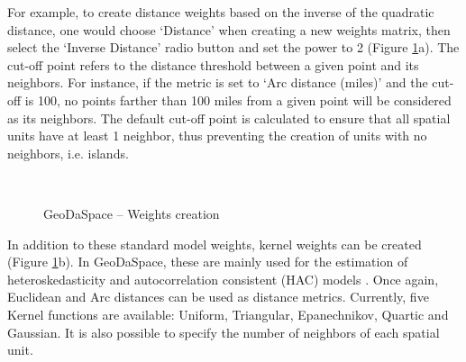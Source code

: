 \documentclass{article}
\begin{document}
For example, to create distance weights based on the inverse of the quadratic distance, one would choose `Distance' when creating a new weights matrix, then select the `Inverse Distance' radio button and set the power to 2 (Figure \ref{f:weights}a). The cut-off point refers to the distance threshold between a given point and its neighbors.  For instance, if the metric is set to `Arc distance (miles)' and the cut-off is 100, no points farther than 100 miles from a given point will be considered as its neighbors. The default cut-off point is calculated to ensure that all spatial units have at least 1 neighbor, thus preventing the creation of units with no neighbors, i.e. islands.

\begin{figure}[htb]
\centering
{} 
 \\
\caption{GeoDaSpace -- Weights creation}
\label{f:weights}
\end{figure}

In addition to these standard model weights, kernel weights can be created (Figure \ref{f:weights}b). In GeoDaSpace, these are mainly used for the estimation of heteroskedasticity and autocorrelation consistent (HAC) models \citet{Kelejian07}. Once again, Euclidean and Arc distances can be used as distance metrics. Currently, five Kernel functions are available: Uniform, Triangular, Epanechnikov, Quartic and Gaussian. It is also possible to specify the number of neighbors of each spatial unit.
\end{document}
